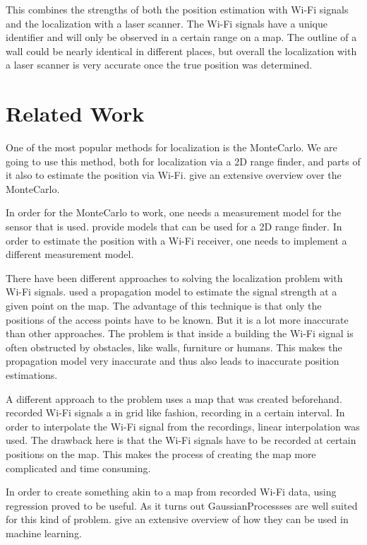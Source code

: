 This combines the strengths of both the position estimation with Wi-Fi signals and the localization with a laser scanner. The Wi-Fi signals have a unique identifier and will only be observed in a certain range on a map. The outline of a wall could be nearly identical in different places, but overall the localization with a laser scanner is very accurate once the true position was determined. 

\section{Related Work}
One of the most popular methods for localization is the \Gls{MonteCarlo}. We are going to use this method, both for localization via a 2D range finder, and parts of it also to estimate the position via Wi-Fi. \citet{Thrun:2005:PR:1121596} give an extensive overview over the \Gls{MonteCarlo}.

In order for the \Gls{MonteCarlo} to work, one needs a measurement model for the sensor that is used. \citet{Thrun:2005:PR:1121596} provide models that can be used for a 2D range finder. In order to estimate the position with a Wi-Fi receiver, one needs to implement a different measurement model.

There have been different approaches to solving the localization problem with Wi-Fi signals. \citet{serrano2012robot} used a propagation model to estimate the signal strength at a given point on the map. The advantage of this technique is that only the positions of the access points have to be known. But it is a lot more inaccurate than other approaches. The problem is that inside a building the Wi-Fi signal is often obstructed by obstacles, like walls, furniture or humans.  This makes the propagation model very inaccurate and thus also leads to inaccurate position estimations.

A different approach to the problem uses a map that was created beforehand. \citet{biswas2010wifi} recorded Wi-Fi signals a in grid like fashion, recording in a certain interval. In order to interpolate the Wi-Fi signal from the recordings, linear interpolation was used. The drawback here is that the Wi-Fi signals have to be recorded at certain positions on the map. This makes the process of creating the map more complicated and time consuming.

In order to create something akin to a map from recorded Wi-Fi data, using regression proved to be useful. As it turns out \Glspl{GaussianProcess}es are well suited for this kind of problem. \citet{Rasmussen:2005:GPM:1162254} give an extensive overview of how they can be used in machine learning. 

